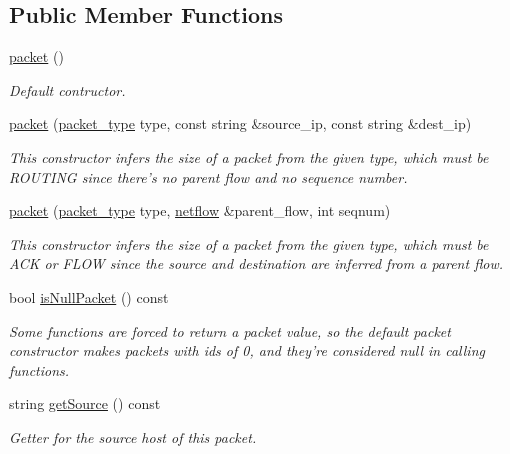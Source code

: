 \subsection*{Public Member Functions}
\begin{DoxyCompactItemize}
\item 
\hyperlink{classpacket_ae33ebc35602983d12aa139f050f77938}{packet} ()
\begin{DoxyCompactList}\small\item\em Default contructor. \end{DoxyCompactList}\item 
\hyperlink{classpacket_ae65d1c323eff4f7bc1c092d42b52fd30}{packet} (\hyperlink{util_8h_ad875bcb78f9bd8625c5e454cafdc8de7}{packet\-\_\-type} type, const string \&source\-\_\-ip, const string \&dest\-\_\-ip)
\begin{DoxyCompactList}\small\item\em This constructor infers the size of a packet from the given type, which must be R\-O\-U\-T\-I\-N\-G since there's no parent flow and no sequence number. \end{DoxyCompactList}\item 
\hyperlink{classpacket_a32d7fad8b9fb8e6b130d6d93fefb675d}{packet} (\hyperlink{util_8h_ad875bcb78f9bd8625c5e454cafdc8de7}{packet\-\_\-type} type, \hyperlink{classnetflow}{netflow} \&parent\-\_\-flow, int seqnum)
\begin{DoxyCompactList}\small\item\em This constructor infers the size of a packet from the given type, which must be A\-C\-K or F\-L\-O\-W since the source and destination are inferred from a parent flow. \end{DoxyCompactList}\item 
bool \hyperlink{classpacket_ae85fc39129ba8cc568a56d2b5f7dfa29}{is\-Null\-Packet} () const 
\begin{DoxyCompactList}\small\item\em Some functions are forced to return a packet value, so the default packet constructor makes packets with ids of 0, and they're considered null in calling functions. \end{DoxyCompactList}\item 
string \hyperlink{classpacket_a9df0e590a6e0528a44f5109059e67e87}{get\-Source} () const 
\begin{DoxyCompactList}\small\item\em Getter for the source host of this packet. \end{DoxyCompactList}\item 

\end{DoxyCompactItemize}
